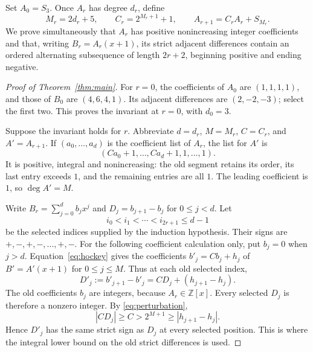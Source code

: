 \documentclass[11pt]{article}
\newcommand{\Z}{\mathbb Z}
\begin{document}
Set $A_0=S_3$. Once $A_r$ has degree $d_r$, define
\begin{equation}\label{eq:recursion}
 M_r=2d_r+5,\qquad C_r=2^{M_r+1}+1,
 \qquad A_{r+1}=C_rA_r+S_{M_r}.
\end{equation}
We prove simultaneously that $A_r$ has positive nonincreasing integer
coefficients and that, writing $B_r=A_r(x+1)$, its strict adjacent
differences contain an ordered alternating subsequence of length
$2r+2$, beginning positive and ending negative.

\begin{proof}[Proof of Theorem~\ref{thm:main}]
For $r=0$, the coefficients of $A_0$ are $(1,1,1,1)$, and those of
$B_0$ are $(4,6,4,1)$. Its adjacent differences are
$(2,-2,-3)$; select the first two. This proves the invariant at
$r=0$, with $d_0=3$.

Suppose the invariant holds for $r$. Abbreviate $d=d_r$, $M=M_r$,
$C=C_r$, and $A'=A_{r+1}$. If $(a_0,\ldots,a_d)$ is the
coefficient list of $A_r$, the list for $A'$ is
\begin{equation}\label{eq:input-list}
 (Ca_0+1,\ldots,Ca_d+1,1,\ldots,1).
\end{equation}
It is positive, integral and nonincreasing: the old segment retains
its order, its last entry exceeds $1$, and the remaining entries are
all $1$. The leading coefficient is $1$, so $\deg A'=M$.

Write $B_r=\sum_{j=0}^{d}b_jx^j$ and
$D_j=b_{j+1}-b_j$ for $0\leq j<d$. Let
\[
 i_0<i_1<\cdots<i_{2r+1}\leq d-1
\]
be the selected indices supplied by the induction hypothesis.
Their signs are $+,-,+,-,\ldots,+,-$.
For the following coefficient calculation only, put $b_j=0$ when
$j>d$. Equation~\eqref{eq:hockey} gives the coefficients
$b'_j=Cb_j+h_j$ of $B'=A'(x+1)$ for $0\leq j\leq M$.
Thus at each old selected index,
\[
 D'_j:=b'_{j+1}-b'_j=CD_j+(h_{j+1}-h_j).
\]
The old coefficients $b_j$ are integers, because $A_r\in\Z[x]$.
Every selected $D_j$ is therefore a nonzero integer. By
\eqref{eq:perturbation},
\begin{equation}\label{eq:strict-survival}
 |CD_j|\geq C>2^{M+1}\geq|h_{j+1}-h_j|.
\end{equation}
Hence $D'_j$ has the same strict sign as $D_j$ at every selected
position. This is where the integral lower bound on the old strict
differences is used.


\end{proof}
\end{document}
